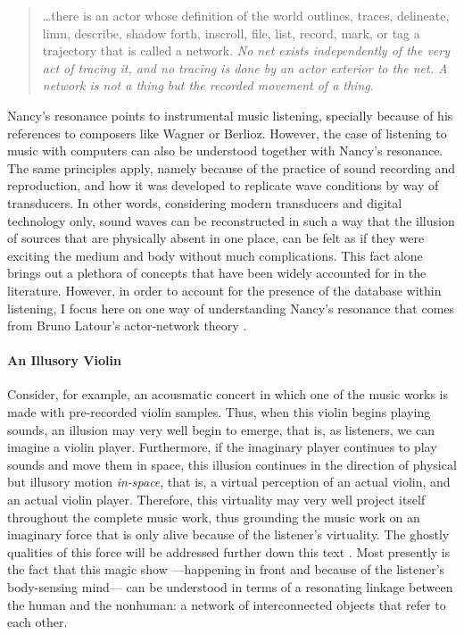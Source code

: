 \begin{quote}
	\dots there is an actor whose definition of the world outlines, traces, delineate, limn, describe, shadow forth, inscroll, file, list, record, mark, or tag a trajectory that is called a network. \textit{No net exists independently of the very act of tracing it, and no tracing is done by an actor exterior to the net. A network is not a thing but the recorded movement of a thing}. \im \parencite[14]{Lat90:On}
\end{quote} %

Nancy's resonance points to instrumental music listening, specially because of his references to composers like Wagner or Berlioz. However, the case of listening to music with computers can also be understood together with Nancy's resonance. The same principles apply, namely because of the practice of sound recording and reproduction, and how it was developed to replicate wave conditions by way of transducers. In other words, considering modern transducers and digital technology only, sound waves can be reconstructed in such a way that the illusion of sources that are physically absent in one place, can be felt as if they were exciting the medium and body without much complications. This fact alone brings out a plethora of concepts that have been widely accounted for in the literature. However, in order to account for the presence of the database within listening, I focus here on one way of understanding Nancy's resonance that comes from Bruno Latour's actor-network theory \parencite{Lat90:On, Lat93:We}.

\paragraph{An Illusory Violin}
Consider, for example, an acousmatic concert in which one of the music works is made with pre-recorded violin samples. Thus, when this violin begins playing sounds, an illusion may very well begin to emerge, that is, as listeners, we can imagine a violin player. Furthermore, if the imaginary player continues to play sounds and move them in space, this illusion continues in the direction of physical but illusory motion \textit{in-space}, that is, a virtual perception of an actual violin, and an actual violin player. Therefore, this virtuality may very well project itself throughout the complete music work, thus grounding the music work on an imaginary force that is only alive because of the listener's virtuality. The ghostly qualities of this force will be addressed further down this text . Most presently is the fact that this magic show ---happening in front and because of the listener's body-sensing mind--- can be understood in terms of a resonating linkage between the human and the nonhuman: a network of interconnected objects that refer to each other. 

